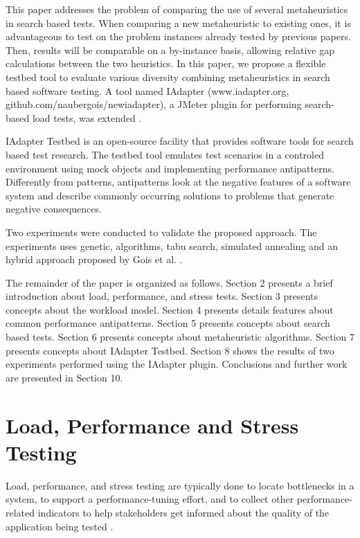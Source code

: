 \documentclass[times]{stvrauth}
\begin{document}
This paper addresses the problem of comparing the use of several metaheuristics in search based tests. When comparing a new metaheuristic to existing ones, it is advantageous to test on the problem instances already tested by previous papers. Then, results will be comparable on a by-instance basis, allowing relative gap calculations between the two heuristics. In this paper, we propose a flexible testbed tool to evaluate various diversity combining metaheuristics in search based software testing. A tool named IAdapter (www.iadapter.org, github.com/naubergois/newiadapter), a JMeter plugin for performing search-based load tests, was extended \cite{Gois2016}. 


IAdapter Testbed is an open-source facility that provides software tools for search based test research. The testbed tool emulates test scenarios in a controled environment using mock objects and implementing performance antipatterns. Differently from patterns, antipatterns look at the negative features of a software system and describe commonly occurring solutions to problems that generate negative consequences.

Two experiments were conducted to validate the proposed approach. The experiments uses genetic, algorithms, tabu search, simulated annealing and an hybrid approach proposed by Gois et al. \cite{Gois2016}.

The remainder of the paper is organized as follows. Section 2 presents a brief introduction about load, performance, and stress tests. Section 3 presents concepts about the workload model. Section 4 presents details features about common performance antipatterns. Section 5 presents concepts about search based tests. Section 6 presents concepts about metaheuristic algorithms. Section 7 presents concepts about IAdapter Testbed. Section 8 shows the results of two experiments performed using the IAdapter plugin.  Conclusions and further work are presented in Section 10.


\section{Load, Performance and Stress Testing}

Load, performance, and stress testing are typically done to locate bottlenecks in a system, to support a performance-tuning effort, and to collect other performance-related indicators to help stakeholders get informed about the quality of the application being tested \cite{Sandler2004} \cite{Corporation2007}. 
\end{document}
